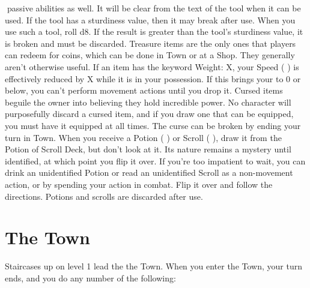 \documentclass{book}
\begin{document}
passive abilities as well. It will be clear from the text of the tool when it can be used. If the tool has a sturdiness
value, then it may break after use. When you use such a tool, roll d8. If the result is greater than the tool’s
sturdiness value, it is broken and must be discarded.
Treasure items are the only ones that players can redeem for coins, which can be done in Town or at a Shop. They
generally aren’t otherwise useful.
If an item has the keyword Weight: X, your Speed ( ) is effectively reduced by X while it is in your possession.
If this brings your to 0 or below, you can’t perform movement actions until you drop it.
Cursed items beguile the owner into believing they hold incredible power. No character will purposefully discard
a cursed item, and if you draw one that can be equipped, you must have it equipped at all times. The curse can be
broken by ending your turn in Town.
When you receive a Potion ( ) or Scroll ( ), draw it from the Potion of Scroll Deck, but don’t look at it. Its nature
remains a mystery until identified, at which point you flip it over. If you’re too impatient to wait, you can drink an
unidentified Potion or read an unidentified Scroll as a non-movement action, or by spending your action in combat.
Flip it over and follow the directions. Potions and scrolls are discarded after use.

\section{The Town} \label{town}

Staircases up on level 1 lead the the Town. When you enter the Town, your turn ends, and you do any number of
the following:
\end{document}
